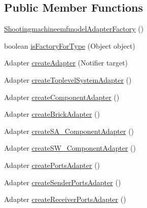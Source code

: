 \subsection*{Public Member Functions}
\begin{DoxyCompactItemize}
\item 
\hyperlink{classshootingmachineemfmodel_1_1util_1_1_shootingmachineemfmodel_adapter_factory_a028bbd44aec3d4e9f00bb30aed5c72d3}{Shootingmachineemfmodel\-Adapter\-Factory} ()
\item 
boolean \hyperlink{classshootingmachineemfmodel_1_1util_1_1_shootingmachineemfmodel_adapter_factory_a8ecac68d7d2bb7e30e7c9b52d2ebffde}{is\-Factory\-For\-Type} (Object object)
\item 
Adapter \hyperlink{classshootingmachineemfmodel_1_1util_1_1_shootingmachineemfmodel_adapter_factory_aa7a23bf98db574ff8c26f7a72cf6e4bb}{create\-Adapter} (Notifier target)
\item 
Adapter \hyperlink{classshootingmachineemfmodel_1_1util_1_1_shootingmachineemfmodel_adapter_factory_ae2370fbe07b56633e2bbd38c653732f2}{create\-Toplevel\-System\-Adapter} ()
\item 
Adapter \hyperlink{classshootingmachineemfmodel_1_1util_1_1_shootingmachineemfmodel_adapter_factory_a99b6962ef0c18bc43c15da6af5d8fd05}{create\-Component\-Adapter} ()
\item 
Adapter \hyperlink{classshootingmachineemfmodel_1_1util_1_1_shootingmachineemfmodel_adapter_factory_ae52edcc3b6ed5c2911866907dbaf749e}{create\-Brick\-Adapter} ()
\item 
Adapter \hyperlink{classshootingmachineemfmodel_1_1util_1_1_shootingmachineemfmodel_adapter_factory_a84048e25b540a8c5c3ea767e34265c48}{create\-S\-A\-\_\-\-Component\-Adapter} ()
\item 
Adapter \hyperlink{classshootingmachineemfmodel_1_1util_1_1_shootingmachineemfmodel_adapter_factory_ac1a73c99216c93fa7a37f59487984bd8}{create\-S\-W\-\_\-\-Component\-Adapter} ()
\item 
Adapter \hyperlink{classshootingmachineemfmodel_1_1util_1_1_shootingmachineemfmodel_adapter_factory_ab33c236ff5e9c5b8a7f8e0cdb86bccb7}{create\-Ports\-Adapter} ()
\item 
Adapter \hyperlink{classshootingmachineemfmodel_1_1util_1_1_shootingmachineemfmodel_adapter_factory_a84e83e5f8f3fa024aed8d4805c83e660}{create\-Sender\-Ports\-Adapter} ()
\item 
Adapter \hyperlink{classshootingmachineemfmodel_1_1util_1_1_shootingmachineemfmodel_adapter_factory_ae2e1e6733db32520c030260bd40e25f9}{create\-Receiver\-Ports\-Adapter} ()

\end{DoxyCompactItemize}
